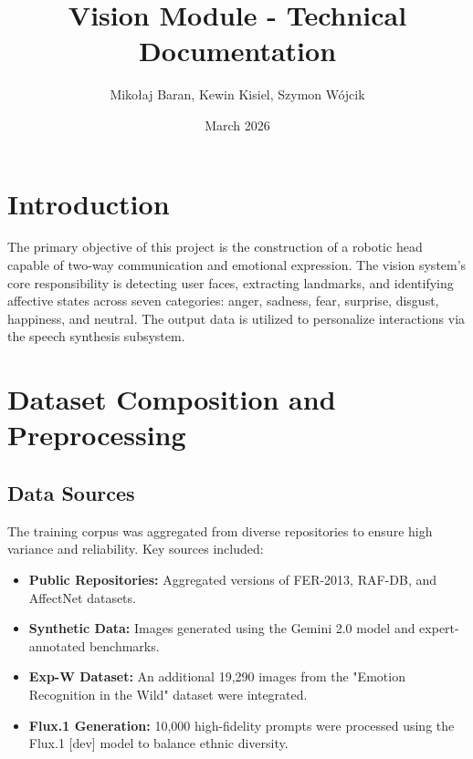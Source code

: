 \documentclass{article}
\title{Vision Module - Technical Documentation}
\author{Mikołaj Baran, Kewin Kisiel, Szymon Wójcik}
\date{March 2026}
\begin{document}
\maketitle
\tableofcontents
\newpage

\section{Introduction}
The primary objective of this project is the construction of a robotic head capable of two-way communication and emotional expression. The vision system's core responsibility is detecting user faces, extracting landmarks, and identifying affective states across seven categories: anger, sadness, fear, surprise, disgust, happiness, and neutral. The output data is utilized to personalize interactions via the speech synthesis subsystem.

\section{Dataset Composition and Preprocessing}

\subsection{Data Sources}
The training corpus was aggregated from diverse repositories to ensure high variance and reliability. Key sources included:
\begin{itemize}
    \item \textbf{Public Repositories:} Aggregated versions of FER-2013, RAF-DB, and AffectNet datasets.
    \item \textbf{Synthetic Data:} Images generated using the Gemini 2.0 model and expert-annotated benchmarks.
    \item \textbf{Exp-W Dataset:} An additional 19,290 images from the "Emotion Recognition in the Wild" dataset were integrated.
    \item \textbf{Flux.1 Generation:} 10,000 high-fidelity prompts were processed using the Flux.1 [dev] model to balance ethnic diversity.
\end{itemize}
\end{document}
